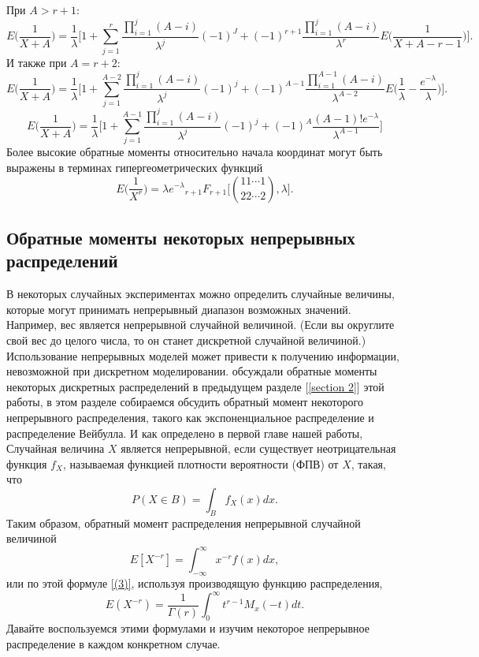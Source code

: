 \documentclass[13pt]{article}
\begin{document}
При $A>r+1$:
\begin{equation}\label{eq::27}
    E\Big(\frac{1}{X+A}\Big) = \frac{1}{\lambda}\Bigg[1+\sum_{j=1}^{r}\frac{\prod_{i=1}^{j}(A-i)}{\lambda^{j}}(-1)^{J}+(-1)^{r+1}\frac{\prod_{i=1}^{j}(A-i)}{\lambda^{r}}E\Big(\frac{1}{X+A-r-1}\Big)\Bigg].
\end{equation}
И также при $ A = r+2 $:
\begin{equation*}\label{eq::28}
    E\Big(\frac{1}{X+A}\Big) = \frac{1}{\lambda}\Bigg[1+\sum_{j=1}^{A-2}\frac{\prod_{i=1}^{j}(A-i)}{\lambda^{j}}(-1)^{j}+(-1)^{A-1}\frac{\prod_{i=1}^{A-1}(A-i)}{\lambda^{A-2}}E\Big(\frac{1}{\lambda}-\frac{e^{-\lambda}}{\lambda}\Big)\Bigg].
\end{equation*}
\begin{equation}\label{eq::29}
    E\Big(\frac{1}{X+A}\Big) = \frac{1}{\lambda}\Bigg[1+\sum_{j=1}^{A-1}\frac{\prod_{i=1}^{j}(A-i)}{\lambda^{j}}(-1)^{j}+(-1)^{A}\frac{(A-1)!e^{-\lambda}}{\lambda^{A-1}}\Bigg]
\end{equation}
Более высокие обратные моменты относительно начала координат могут быть выражены в терминах гипергеометрических функций
\[
E\Big(\frac{1}{X^{r}}\Big) = {\lambda e^{-\lambda}} _{r+1}F_{r+1}\Bigg[\binom{11 \cdots 1}{22 \cdots 2 },\lambda\Bigg].
\]

\newpage
\subsection{Обратные моменты некоторых непрерывных распределений}

В некоторых случайных экспериментах можно определить случайные величины, которые могут принимать непрерывный диапазон возможных значений. Например, вес является непрерывной случайной величиной. (Если вы округлите свой вес до целого числа, то он станет дискретной случайной величиной.) Использование непрерывных моделей может привести к получению информации, невозможной при дискретном моделировании. обсуждали обратные моменты некоторых дискретных распределений в предыдущем разделе [\ref{section 2}] этой работы, в этом разделе собираемся обсудить обратный момент некоторого непрерывного распределения, такого как экспоненциальное распределение и распределение Вейбулла. И как определено в первой главе нашей работы, Случайная величина $X$ является непрерывной, если существует неотрицательная функция $f_X$, называемая функцией плотности вероятности (ФПВ) от $X$, такая, что
\[
P(X \in B) = \int_{B}f_{X}(x)dx.
\]
Таким образом, обратный момент  распределения непрерывной случайной величиной
\[ 
E[X^{-r}] = \int_{-\infty}^{\infty} x^{-r} f(x) dx ,
\]
или по этой формуле \ref{(3)}, используя производящую функцию распределения,
\begin{equation*}
    E(X^{-r}) = \frac{1}{\Gamma(r)}\int_{0}^{\infty} t^{r-1}M_{x}(-t)dt.
\end{equation*}
Давайте воспользуемся этими формулами и изучим некоторое непрерывное распределение в каждом конкретном случае.
\end{document}
